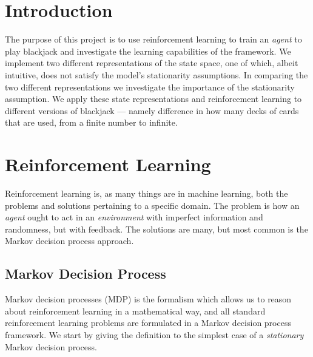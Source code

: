 



\section{Introduction}

The purpose of this project is to use reinforcement learning to train an \textit{agent} to play blackjack and investigate the learning capabilities of the framework. 
We implement two different representations of the state space, one of which, albeit intuitive, does not satisfy the model's stationarity assumptions. In comparing the two different representations we investigate the importance of the stationarity assumption. We apply these state representations and reinforcement learning to different versions of blackjack --- namely difference in how many decks of cards that are used, from a finite number to infinite.


\section*{Reinforcement Learning}
Reinforcement learning is, as many things are in machine learning, both the problems and solutions pertaining to a specific domain. The problem is how an \textit{agent} ought to act in an \textit{environment} with imperfect information and randomness, but with feedback. The solutions are many, but most common is the Markov decision process approach.
 
\subsection*{Markov Decision Process}
Markov decision processes (MDP) is the formalism  which allows us to reason about reinforcement learning in a mathematical way, and all standard reinforcement learning problems are formulated in a Markov decision process framework. We start by giving the definition to the simplest case of a \textit{stationary} Markov decision process.

